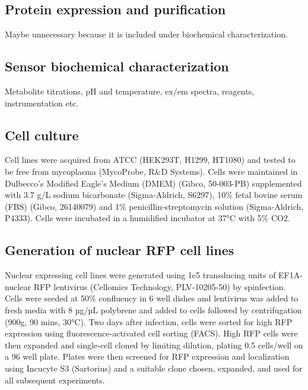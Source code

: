 \documentclass[9pt,lineno]{elife}
\begin{document}
\subsection{Protein expression and purification}
Maybe unnecessary because it is included under biochemical characterization.


\subsection{Sensor biochemical characterization}
Metabolite titrations, pH and temperature, ex/em spectra, reagents, instrumentation etc.





\subsection{Cell culture}
Cell lines were acquired from ATCC (HEK293T, H1299, HT1080) and tested to be free from mycoplasma (MycoProbe, R\&D Systems).
Cells were maintained in Dulbecco’s Modified Eagle’s Medium (DMEM) (Gibco, 50-003-PB) supplemented with 3.7 g/L sodium bicarbonate (Sigma-Aldrich, S6297), 10\% fetal bovine serum (FBS) (Gibco, 26140079) and 1\% penicillin-streptomycin solution (Sigma-Aldrich, P4333).
Cells were incubated in a humidified incubator at 37°C with 5\% CO2.

\subsection{Generation of nuclear RFP cell lines}
Nuclear expressing cell lines were generated using 1e5 transducing units of EF1A-nuclear RFP lentivirus (Cellomics Technology, PLV-10205-50) by spinfection.
Cells were seeded at 50\% confluency in 6 well dishes and lentivirus was added to fresh media with 8 µg/µL polybrene and added to cells followed by centrifugation (900g, 90 mins, 30°C).
Two days after infection, cells were sorted for high RFP expression using fluorescence-activated cell sorting (FACS).
High RFP cells were then expanded and single-cell cloned by limiting dilution, plating 0.5 cells/well on a 96 well plate.
Plates were then screened for RFP expression and localization using Incucyte S3 (Sartorius) and a suitable clone chosen, expanded, and used for all subsequent experiments. 
\end{document}
